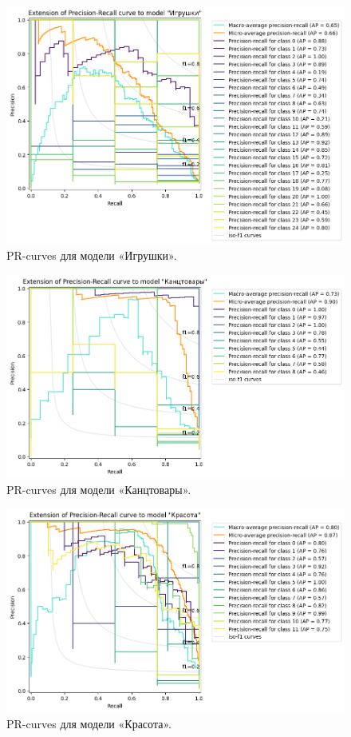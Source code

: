 \documentclass[a4paper,12pt]{extarticle}
\begin{document}
\begin{figure}[hbtp]
	\centering
	\includegraphics[scale=0.7]{pr_curves/prcurve_Игрушки.png}
	\caption{PR-curves для модели «Игрушки».}
	\label{fig:prcurve_Игрушки}
\end{figure}

\begin{figure}[hbtp]
	\centering
	\includegraphics[scale=0.7]{pr_curves/prcurve_Канцтовары.png}
	\caption{PR-curves для модели «Канцтовары».}
	\label{fig:prcurve_Канцтовары}
\end{figure}

\begin{figure}[hbtp]
	\centering
	\includegraphics[scale=0.7]{pr_curves/prcurve_Красота.png}
	\caption{PR-curves для модели «Красота».}
	\label{fig:prcurve_Красота}
\end{figure}
\end{document}
